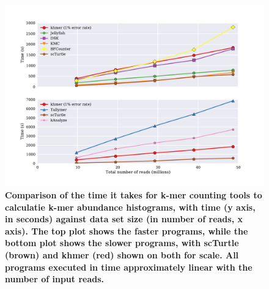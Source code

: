 \documentclass[10pt]{article}
\begin{document}



\begin{figure}[!ht]
\centerline{\includegraphics[width=5in]{./figure/time_benchmark}}

\caption{\bf Comparison of the time it takes for k-mer counting tools
  to calculatie k-mer abundance histograms, with time (y axis, in
  seconds) against data set size (in number of reads, x axis).  The
  top plot shows the faster programs, while the bottom plot shows the
  slower programs, with scTurtle (brown) and khmer (red) shown on both
  for scale.  All programs executed in time approximately linear with
  the number of input reads.}

\label{fig:cmp_time}
\end{figure}
\end{document}

